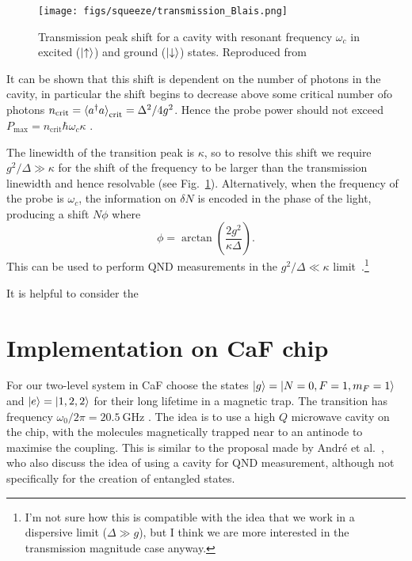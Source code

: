 \documentclass{article}
\begin{document}
\begin{figure}
  \centering
  \texttt{[image: figs/squeeze/transmission\_Blais.png]}
  \caption{Transmission peak shift for a cavity with resonant frequency
  $\omega_c$ in excited ($\ket{\uparrow}$) and ground ($\ket{\downarrow}$)
  states.  Reproduced from~\cite{PhysRevA.69.062320}}
  \label{transmission}
\end{figure}

It can be shown that this shift is dependent on the number of photons in the
cavity, in particular the shift begins to decrease above some critical number
ofo photons $n_\text{crit} = \braket{a^\dagger a}_\text{crit} = \Delta^2/4g^2$.
Hence the probe power should not exceed $P_\text{max} = n_\text{crit}\hbar
\omega_c \kappa$ \cite{PhysRevA.69.062320}.

The linewidth of the transition peak is $\kappa$, so to resolve this shift we
require $g^2/ \Delta \gg \kappa$ for the shift of the frequency to be larger
than the transmission linewidth and hence resolvable (see
Fig.~\ref{transmission}). Alternatively, when the frequency of the probe is
$\omega_c$, the information on $\delta N$ is encoded in the phase of the light,
producing a shift $N\phi$ where
%
\begin{equation}
  \phi = \arctan \left(\frac{2g^2}{\kappa \Delta}\right).
\end{equation}
%
This can be used to perform QND measurements in the $g^2/ \Delta \ll
\kappa$ limit~\cite{PhysRevA.69.062320}.\footnote{I'm not sure how this is
compatible with the idea that we work in a dispersive limit ($\Delta \gg g$),
but I think we are more interested in the transmission magnitude case anyway.}


It is helpful to consider the 

\section{Implementation on CaF chip}

For our two-level system in CaF choose the states $\ket{g} = \ket{N=0, F=1,
m_F=1}$ and $\ket{e} = \ket{1, 2, 2}$ for their long lifetime in a magnetic
trap. The transition has frequency $\omega_0/2\pi = \SI{20.5}{\giga\hertz}$
\cite{Williams2018}. The idea is to use a high $Q$ microwave cavity on the
chip, with the molecules magnetically trapped near to an antinode to maximise
the coupling. This is similar to the proposal made by Andr\'e et
al.~\cite{Andre2006}, who also discuss the idea of using a cavity for QND
measurement, although not specifically for the creation of entangled states.
\end{document}
